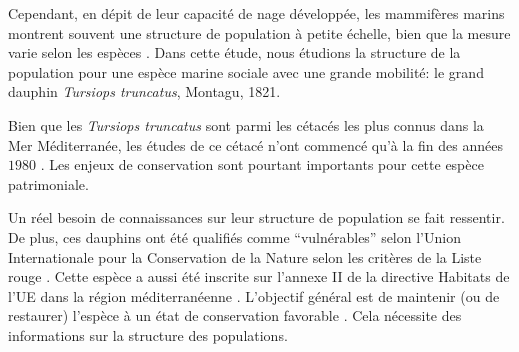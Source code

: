 \documentclass[a4paper,12pt,twoside]{article}\usepackage[]{graphicx}\usepackage[]{color}
\begin{document}
\begin {bibunit} [newbst]
Cependant, en dépit de leur capacité de nage développée, les mammifères marins montrent souvent une structure de population à petite échelle, bien que la mesure varie selon les espèces \citep{hoelzel2002low}. Dans cette étude, nous étudions la structure de la population pour une espèce marine sociale avec une grande mobilité: le grand dauphin \emph{Tursiops truncatus}, Montagu, 1821.

Bien que les \emph{Tursiops truncatus} sont parmi les cétacés les plus connus dans la Mer Méditerranée, les études de ce cétacé n'ont commencé qu'à la fin des années $1980$ \citep{bearzi2009ecology}. Les enjeux de conservation sont pourtant importants pour cette espèce patrimoniale. 

Un réel besoin de connaissances sur leur structure de population se fait ressentir. De plus, ces dauphins ont été qualifiés comme ``vulnérables'' selon l'Union Internationale pour la Conservation de la Nature selon les critères de la Liste rouge \citep{bearzi2006common}. Cette espèce a aussi été inscrite sur l'annexe II de la directive Habitats de l'UE dans la région méditerranéenne \citep{Laran2016}. L'objectif général est de maintenir (ou de restaurer) l'espèce à un état de conservation favorable \citep{evans2004monitoring}. Cela nécessite des informations sur la structure des populations.


\end{bibunit}
\end{document}
